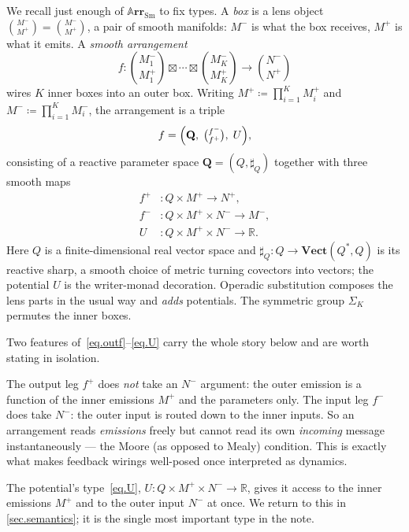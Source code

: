\documentclass[11pt]{article}
\theoremstyle{plain}
\theoremstyle{definition}
\theoremstyle{remark}
\newcommand{\rr}{\mathbb{R}}
\newcommand{\Cat}[1]{\mathbf{#1}}
\newcommand{\Sm}{\mathrm{Sm}}
\newcommand{\arr}{\mathbb{A}\Cat{rr}}    %
\newcommand{\sarr}{\arr_{\Sm}}           %
\newcommand{\vect}{\Cat{Vect}}
\newcommand{\rv}[1]{\mathbf{#1}}         %
\newcommand{\sharpR}{\sharp}
\newcommand{\inpt}[1]{#1^{-}}
\newcommand{\outp}[1]{#1^{+}}
\newcommand{\lensob}[1]{\binom{\inpt{#1}}{\outp{#1}}}
\newcommand{\ltens}{\boxtimes}           %
\begin{document}
We recall just enough of $\sarr$ to fix types. A \emph{box} is a lens
object $\lensob M=\binom{\inpt M}{\outp M}$, a pair of smooth manifolds:
$\inpt M$ is what the box receives, $\outp M$ is what it emits. A
\emph{smooth arrangement}
\[
  f\colon\lensob{M_1}\ltens\cdots\ltens\lensob{M_K}\longrightarrow\lensob N
\]
wires $K$ inner boxes into an outer box. Writing
$\outp M\coloneqq\prod_{i=1}^{K}\outp{M_i}$ and
$\inpt M\coloneqq\prod_{i=1}^{K}\inpt{M_i}$, the arrangement is a triple
\begin{equation}\label{eq.arr}
  f=\Bigl(\rv Q,\;\tbinom{\inpt f}{\outp f},\;U\Bigr),
\end{equation}
consisting of a reactive parameter space $\rv Q=(Q,\sharpR_Q)$ together
with three smooth maps
\begin{align}
  \outp f &\colon Q\times\outp M \longrightarrow \outp N, \label{eq.outf}\\
  \inpt f &\colon Q\times\outp M\times\inpt N \longrightarrow \inpt M, \label{eq.inf}\\
       U  &\colon Q\times\outp M\times\inpt N \longrightarrow \rr. \label{eq.U}
\end{align}
Here $Q$ is a finite-dimensional real vector space and
$\sharpR_Q\colon Q\to\vect(Q^{*},Q)$ is its reactive sharp, a smooth
choice of metric turning covectors into vectors; the potential $U$ is
the writer-monad decoration. Operadic substitution composes the lens
parts in the usual way and \emph{adds} potentials. The symmetric group
$\Sigma_K$ permutes the inner boxes.

Two features of~\eqref{eq.outf}--\eqref{eq.U} carry the whole story below
and are worth stating in isolation.

\begin{remark}\label{rmk.moore}
The output leg $\outp f$ does \emph{not} take an $\inpt N$ argument: the
outer emission is a function of the inner emissions $\outp M$ and the
parameters only. The input leg $\inpt f$ does take $\inpt N$: the outer
input is routed down to the inner inputs. So an arrangement reads
\emph{emissions} freely but cannot read its own \emph{incoming} message
instantaneously --- the Moore (as opposed to Mealy) condition. This is
exactly what makes feedback wirings well-posed once interpreted as
dynamics.
\end{remark}

\begin{remark}\label{rmk.bothends}
The potential's type~\eqref{eq.U}, $U\colon Q\times\outp M\times\inpt N\to\rr$,
gives it access to the inner emissions $\outp M$ and to the outer input
$\inpt N$ at once. We return to this in \cref{sec.semantics}; it is the
single most important type in the note.
\end{remark}
\end{document}
